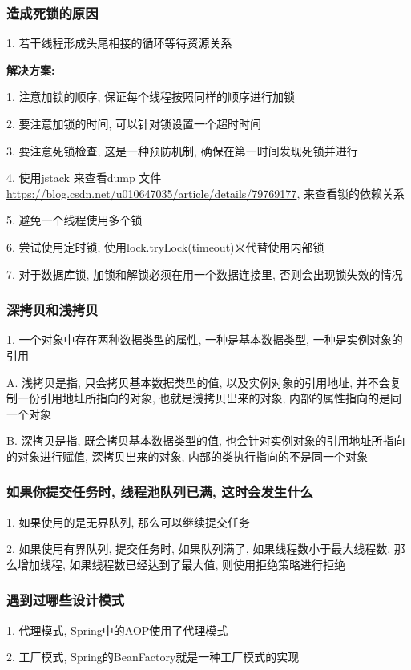 \documentclass[UTF8]{ctexart}
\begin{document}
\subsubsection{造成死锁的原因}
1. 若干线程形成头尾相接的循环等待资源关系 \par
\textbf{解决方案:} \par
1. 注意加锁的顺序, 保证每个线程按照同样的顺序进行加锁 \par
2. 要注意加锁的时间, 可以针对锁设置一个超时时间 \par
3. 要注意死锁检查, 这是一种预防机制, 确保在第一时间发现死锁并进行 \par
4. 使用jstack 来查看dump 文件 \url{https://blog.csdn.net/u010647035/article/details/79769177}, 来查看锁的依赖关系 \par
5. 避免一个线程使用多个锁 \par
6. 尝试使用定时锁, 使用lock.tryLock(timeout)来代替使用内部锁 \par
7. 对于数据库锁, 加锁和解锁必须在用一个数据连接里, 否则会出现锁失效的情况 \par
\subsubsection{深拷贝和浅拷贝}
1. 一个对象中存在两种数据类型的属性, 一种是基本数据类型, 一种是实例对象的引用 \par
A. 浅拷贝是指, 只会拷贝基本数据类型的值, 以及实例对象的引用地址, 并不会复制一份引用地址所指向的对象, 也就是浅拷贝出来的对象, 内部的属性指向的是同一个对象 \par
B. 深拷贝是指, 既会拷贝基本数据类型的值, 也会针对实例对象的引用地址所指向的对象进行赋值, 深拷贝出来的对象, 内部的类执行指向的不是同一个对象 \par
\subsubsection{如果你提交任务时, 线程池队列已满, 这时会发生什么}
1. 如果使用的是无界队列, 那么可以继续提交任务 \par
2. 如果使用有界队列, 提交任务时, 如果队列满了, 如果线程数小于最大线程数, 那么增加线程, 如果线程数已经达到了最大值, 则使用拒绝策略进行拒绝 \par
\subsubsection{遇到过哪些设计模式}
1. 代理模式, Spring中的AOP使用了代理模式 \par
2. 工厂模式, Spring的BeanFactory就是一种工厂模式的实现 \par
\end{document}
